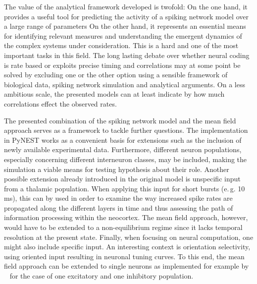 The value of the analytical framework developed is twofold: On the one hand, 
it provides a useful tool for predicting the activity of a spiking network model
over a large range of parameters 
On the other hand, it represents an
essential means for identifying relevant measures and understanding the emergent 
dynamics of the complex systems under consideration. This is a hard and one of the 
most important tasks in this field. 
The long lasting
debate over whether neural coding is rate based or exploits precise timing and correlations
may at some point be solved by
excluding one or the other option using a sensible framework
of biological data, spiking network simulation and analytical arguments. 
On a less ambitious scale, the presented models can at least indicate by how much 
correlations effect the observed rates. 

The presented combination of the spiking network model and the mean field approach
serves as a framework to tackle further questions. 
The implementation in PyNEST works as a convenient basis for extensions 
such as the inclusion of newly available experimental data.
Furthermore, different neuron populations, 
especially concerning different interneuron classes, may be included, 
making the simulation a viable means for testing hypothesis about their 
role. 
Another possible extension already introduced in the 
original model \cite{potjans2014} is unspecific input from a thalamic population. 
When applying this input for short bursts (e.\,g. 10 ms), 
this can by used in order to examine the way
increased spike rates are propagated 
along the different layers in time and thus assessing the 
path of information processing within the neocortex.
The mean field approach, however, would have to be extended to a non-equilibrium 
regime since it lacks temporal resolution at the present state. 
Finally, when focusing on neural computation, one might also include specific input.
An interesting context is orientation selectivity, using 
oriented input resulting in neuronal tuning curves.
To this end, the mean field approach can be extended to single neurons 
as implemented for example by ~ 
for the case of one excitatory and one inhibitory population.




